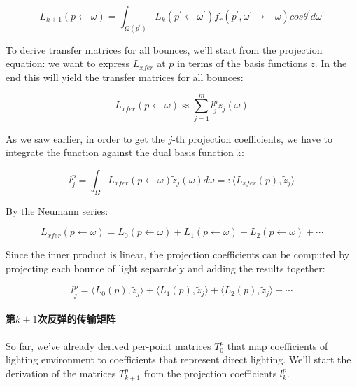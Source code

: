 \begin{equation*}
	L_{k+1}(p\leftarrow\omega)=\int_{\Omega (p^{'})}L_k(p^{'}\leftarrow\omega^{'})f_r(p^{'},\omega^{'}\to -\omega)cos\theta^{'}d\omega^{'}
\end{equation*}

To derive transfer matrices for all bounces, we'll start from the projection equation: we want to express $L_{xfer}$ at $p$ in terms of the basis functions $z$. In the end this will yield the transfer matrices for all bounces:

\begin{equation*}
	L_{xfer}(p\leftarrow\omega)\approx\sum^{m}_{j=1}l^{p}_jz_j(\omega)
\end{equation*}

As we saw earlier, in order to get the $j$-th projection coefficients, we have to integrate the function against the dual basis function $\tilde{z}$:

\begin{equation*}
	l_j^{p}=\int_\Omega L_{xfer}(p\leftarrow\omega)\tilde{z}_j(\omega)d\omega=:\langle L_{xfer}(p),\tilde{z}_j\rangle
\end{equation*}

By the Neumann series:

\begin{equation*}
	L_{xfer}(p\leftarrow\omega)=L_{0}(p\leftarrow\omega)+L_{1}(p\leftarrow\omega)+L_{2}(p\leftarrow\omega)+\cdots
\end{equation*}

Since the inner product is linear, the projection coefficients can be computed by projecting each bounce of light separately and adding the results together:

\begin{equation*}
	l^{p}_j=\langle L_0(p),\tilde{z}_j\rangle+\langle L_1(p),\tilde{z}_j\rangle+\langle L_2(p),\tilde{z}_j\rangle+\cdots
\end{equation*}




\paragraph{第$k+1$次反弹的传输矩阵}
So far, we've already derived per-point matrices $T^{p}_0$ that map coefficients of lighting environment to coefficients that represent direct lighting. We'll start the derivation of the matrices $T^{p}_{k+1}$ from the projection coefficients $l^{p}_k$.




